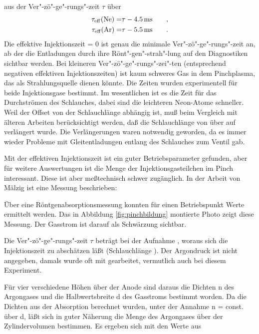 aus der Ver"-zö"-ge"-rungs"-zeit $\tau$ über
\begin{eqnarray*}
  \tau \rm _{eff}(Ne) =
  & \tau - 4.5\,\rm ms
  &\quad ,
  \\
  \tau \rm _{eff}(Ar) =
  & \tau - 5.5\,\rm ms
  &\quad .
\end{eqnarray*}
Die effektive Injektionszeit \teff = 0 ist genau die minimale
Ver"-zö"-ge"-rungs"-zeit an, ab der die Entladungen durch ihre
Rönt"-gen"-strah"-lung auf den Diagnostiken sichtbar werden. Bei
kleineren Ver"-zö"-ge"-rungs"-zei"-ten (entsprechend negativen
effektiven Injektionszeiten) ist kaum schweres Gas in dem
Pinchplasma, das als Strahlungsquelle dienen könnte. Die Zeiten
wurden experimentell für beide Injektionsgase bestimmt. Im
wesentlichen ist es die Zeit für das Durchströmen des Schlauches,
dabei sind die leichteren Neon-Atome schneller. Weil der Offset
von der Schlauchlänge abhängig ist, muß beim Vergleich mit älteren
Arbeiten berücksichtigt werden, daß die Schlauchlänge von
 \cite{doll:diplom} über 
\cite{lucas:diplom} auf  verlängert wurde. Die
Verlängerungen waren notwendig geworden, da es immer wieder
Probleme mit Gleitentladungen entlang des Schlauches zum Ventil
gab.
\par
Mit der effektiven Injektionszeit \teff ist ein guter Betriebsparameter
gefunden, aber für weitere Auswertungen ist die Menge der
Injektionsgasteilchen im Pinch interessant. Diese ist aber meßtechnisch
schwer zugänglich. In der Arbeit von Mälzig \cite{maelzig:phd} ist eine
Messung beschrieben:
\par
Über eine Röntgenabsorptionsmessung konnten für einen Betriebspunkt Werte
ermittelt werden. Das in Abbildung \vref{fig:pinchbildung} montierte Photo
zeigt diese Messung. Der Gasstrom ist darauf als Schwärzung sichtbar.
\par
Die Ver"-zö"-ge"-rungs"-zeit $\tau$ beträgt bei der Aufnahme
, woraus sich die Injektionszeit \teff zu
 abschätzen läßt (Schlauchlänge ). Der
Argondruck ist nicht angegeben, damals wurde oft mit
 gearbeitet, vermutlich auch bei diesem
Experiment.
\par
Für vier verschiedene Höhen über der Anode sind daraus die Dichten n
des Argongases und die Halbwertsbreite d des Gasstroms bestimmt worden.
Da die Dichten aus der Absorption berechnet wurden, unter der Annahme n
= const. über d, läßt sich in guter Näherung die Menge des Argongases
über der Zylindervolumen bestimmen. Es ergeben sich mit den Werte aus
